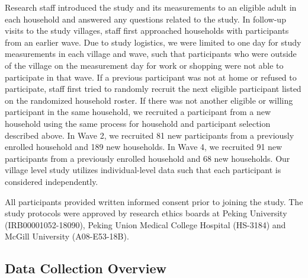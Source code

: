 \documentclass[
  letterpaper,
  DIV=11,
  numbers=noendperiod]{scrartcl}
\begin{document}
Research staff introduced the study and its measurements to an eligible
adult in each household and answered any questions related to the study.
In follow-up visits to the study villages, staff first approached
households with participants from an earlier wave. Due to
study logistics, we were limited to one day for study measurements in
each village and wave, such that participants who were outside of the
village on the measurement day for work or shopping were not able to
participate in that wave. If a previous participant was not at home or
refused to participate, staff first tried to randomly recruit the next
eligible participant listed on the randomized household roster. If there
was not another eligible or willing participant in the same household,
we recruited a participant from a new household using the same process
for household and participant selection described above. In Wave 2, we
recruited 81 new participants from a previously enrolled household and
189 new households. In Wave 4, we recruited 91 new participants from a
previously enrolled household and 68 new households. Our village level
study utilizes individual-level data such that each participant is
considered independently.

All participants provided written informed consent prior to joining the
study. The study protocols were approved by research ethics boards at
Peking University (IRB00001052-18090), Peking Union Medical College
Hospital (HS-3184) and McGill University (A08-E53-18B).

\subsection{Data Collection Overview}\label{data-collection-overview}
\end{document}
